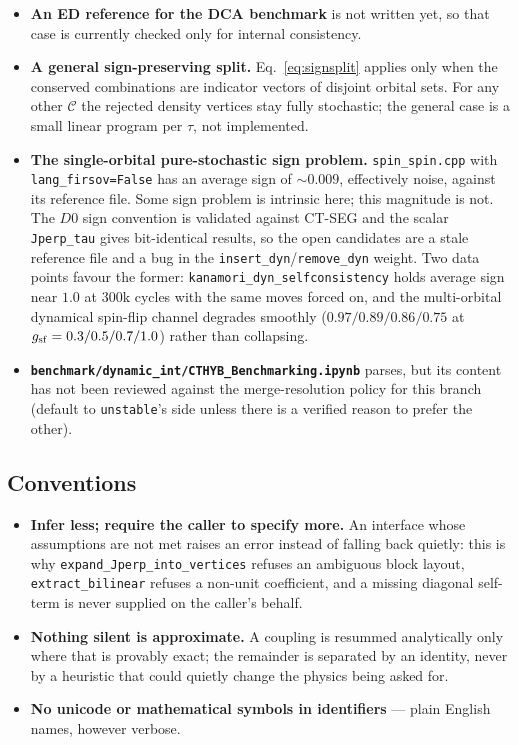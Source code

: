 \documentclass[a4paper,12pt]{article}
\renewcommand{\t}{\ensuremath{\tau}}
\begin{document}
\begin{itemize}
  \item \textbf{An ED reference for the DCA benchmark} is not written yet, so that case is
    currently checked only for internal consistency.
  \item \textbf{A general sign-preserving split.} Eq.~\eqref{eq:signsplit} applies only
    when the conserved combinations are indicator vectors of disjoint orbital sets. For
    any other $\mathcal C$ the rejected density vertices stay fully stochastic; the general
    case is a small linear program per $\t$, not implemented.
  \item \textbf{The single-orbital pure-stochastic sign problem.} \texttt{spin\_spin.cpp}
    with \texttt{lang\_firsov=False} has an average sign of ${\sim}0.009$, effectively
    noise, against its reference file. Some sign problem is intrinsic here; this magnitude
    is not. The $D0$ sign convention is validated against CT-SEG and the scalar
    \texttt{Jperp\_tau} gives bit-identical results, so the open candidates are a stale
    reference file and a bug in the \texttt{insert\_dyn}/\texttt{remove\_dyn} weight. Two
    data points favour the former: \texttt{kanamori\_dyn\_selfconsistency} holds average
    sign near $1.0$ at 300k cycles with the same moves forced on, and the multi-orbital
    dynamical spin-flip channel degrades smoothly ($0.97/0.89/0.86/0.75$ at
    $g_{\rm sf}=0.3/0.5/0.7/1.0$) rather than collapsing.
  \item \textbf{\texttt{benchmark/dynamic\_int/CTHYB\_Benchmarking.ipynb}} parses, but its
    content has not been reviewed against the merge-resolution policy for this branch
    (default to \texttt{unstable}'s side unless there is a verified reason to prefer the
    other).
\end{itemize}

\subsection{Conventions}

\begin{itemize}
  \item \textbf{Infer less; require the caller to specify more.} An interface whose
    assumptions are not met raises an error instead of falling back quietly: this is why
    \texttt{expand\_Jperp\_into\_vertices} refuses an ambiguous block layout,
    \texttt{extract\_bilinear} refuses a non-unit coefficient, and a missing diagonal
    self-term is never supplied on the caller's behalf.
  \item \textbf{Nothing silent is approximate.} A coupling is resummed analytically only
    where that is provably exact; the remainder is separated by an identity, never by a
    heuristic that could quietly change the physics being asked for.
  \item \textbf{No unicode or mathematical symbols in identifiers} --- plain English names,
    however verbose.
\end{itemize}
\end{document}
